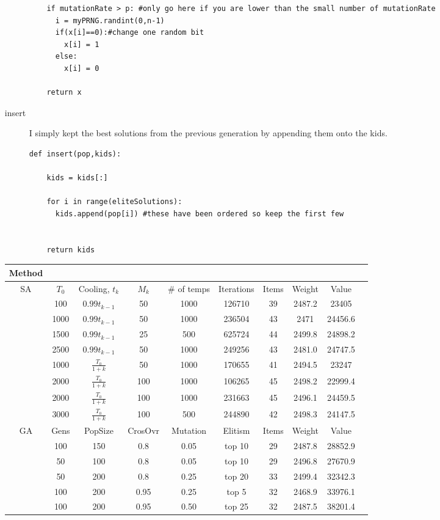 \documentclass[11pt]{article}
\begin{document}
\begin{enumerate}
\begin{description}
\begin{verbatim}
    if mutationRate > p: #only go here if you are lower than the small number of mutationRate
      i = myPRNG.randint(0,n-1)
      if(x[i]==0):#change one random bit
        x[i] = 1
      else:
        x[i] = 0

    return x
\end{verbatim}
\item[insert] I simply kept the best solutions from the previous generation by appending them onto the kids.
\begin{verbatim}
def insert(pop,kids):

    kids = kids[:]

    for i in range(eliteSolutions):
      kids.append(pop[i]) #these have been ordered so keep the first few


    return kids
\end{verbatim}
\end{description}



\begin{tabular}{c*{9}{c}}
Method\\ \hline
SA&$T_0$&Cooling, $t_k$&$M_k$& \# of temps&Iterations&Items&Weight&Value\\ \hline
&100&$0.99t_{k-1}$&50&1000&126710&39&2487.2&23405\\
&1000&$0.99t_{k-1}$&50&1000&236504&43&2471&24456.6\\
&1500&$0.99t_{k-1}$&25&500&625724&44&2499.8&24898.2\\
&2500&$0.99t_{k-1}$&50&1000&249256&43&2481.0&24747.5\\
&1000&$\frac{T_0}{1+k}$&50&1000&170655&41&2494.5&23247\\
&2000&$\frac{T_0}{1+k}$&100&1000&106265&45&2498.2&22999.4\\
&2000&$\frac{T_0}{1+k}$&100&1000&231663&45&2496.1&24459.5\\
&3000&$\frac{T_0}{1+k}$&100&500&244890&42&2498.3&24147.5\\ \hline
GA&Gens&PopSize&CrosOvr&Mutation& Elitism &Items&Weight&Value\\ \hline
&100&150&0.8&0.05&top 10&29&2487.8&28852.9\\
&50&100&0.8&0.05&top 10&29&2496.8&27670.9\\
&50&200&0.8&0.25&top 20&33&2499.4&32342.3\\
&100&200&0.95&0.25&top 5&32&2468.9&33976.1\\
&100&200&0.95&0.50&top 25&32&2487.5&38201.4\\

\hline
\end{tabular}

\end{enumerate}
\end{document}
